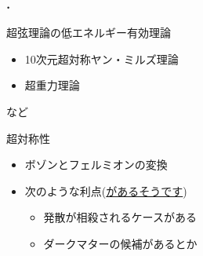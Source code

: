 \documentclass[
  a4paper,uplatex,dvipdfmx,10pt,
  xcolor = {dvipsnames,svgnames},
  hyperref ={colorlinks=true,citecolor=Navy,linkcolor=NavyBlue,urlcolor=purple}
]{beamer}
\begin{document}
\begin{frame}
  \frametitle{\thesection.\thesubsection\ \subsecname}  
  \color{DarkMagenta}

  超弦理論の低エネルギー有効理論
  \begin{itemize}
    \color{DarkMagenta}
    \item 
    10次元超対称ヤン・ミルズ理論
    \item 
    超重力理論
  \end{itemize}
  など

  \vspace{10pt}

  超対称性
  \begin{itemize}
    \color{DarkMagenta}
    \item 
    ボゾンとフェルミオンの変換
    \item 
    次のような利点(\href{https://www-hep.phys.se.tmu.ac.jp/FPWS2014/uploads/7-2014.12.8_Flavour_Jinnouchi.pdf}{があるそうです})
    \begin{itemize}
      \color{DarkMagenta}
      \item 
      発散が相殺されるケースがある
      \item 
      ダークマターの候補があるとか
    \end{itemize}
  \end{itemize}

\end{frame}
\end{document}
